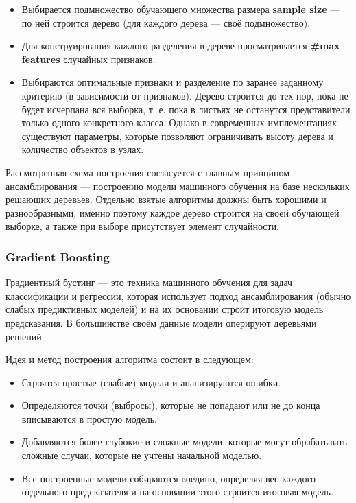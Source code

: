 \documentclass[14pt]{extarticle}
\begin{document}
\begin{itemize}
	\linespread{2}
	\item Выбирается подмножество обучающего множества размера {\bf sample size} --- по ней строится дерево (для каждого дерева --- своё подмножество).
	\item Для конструирования каждого разделения в дереве просматривается {\bf \#max features} случайных признаков.
	\item Выбираются оптимальные признаки и разделение по заранее заданному критерию (в зависимости от признаков). Дерево строится до тех пор, пока не будет исчерпана вся выборка, т. е. пока в листьях не останутся представители только одного конкретного класса. Однако в современных имплементациях существуют параметры, которые позволяют ограничивать высоту дерева и количество объектов в узлах.
\end{itemize}

Рассмотренная схема построения согласуется с главным принципом ансамблирования --- построению модели машинного обучения на базе нескольких решающих деревьев. Отдельно взятые алгоритмы должны быть хорошими и разнообразными, именно поэтому каждое дерево строится на своей обучающей выборке, а также при выборе присутствует элемент случайности.


\subsubsection{Gradient Boosting}

Градиентный бустинг --- это техника машинного обучения для задач классификации и регрессии, которая использует подход ансамблирования (обычно слабых предиктивных моделей) и на их основании строит итоговую модель предсказания. В большинстве своём данные модели оперируют деревьями решений.

Идея и метод построения алгоритма состоит в следующем:

\begin{itemize}
	\linespread{2}
	\item Строятся простые (слабые) модели и анализируются ошибки.
	\item Определяются точки (выбросы), которые не попадают или не до конца вписываются в простую модель.
	\item Добавляются более глубокие и сложные модели, которые могут обрабатывать сложные случаи, которые не учтены начальной моделью.
	\item Все построенные модели собираются воедино, определяя вес каждого отдельного предсказателя и на основании этого строится итоговая модель.
\end{itemize}
\end{document}
